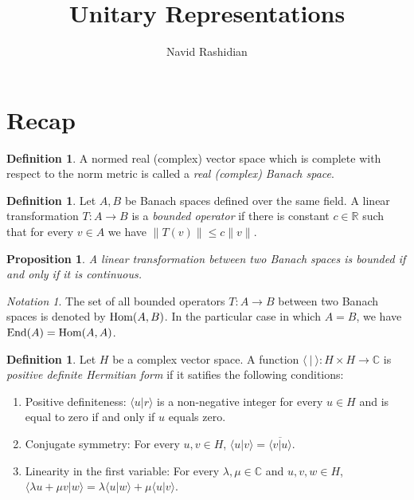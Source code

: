\documentclass[12pt]{article}
\title{Unitary Representations}
\author{Navid Rashidian}
\date{}
\newtheorem{prop}[thm]{Proposition}
\theoremstyle{definition}
\newtheorem{dfn}[thm]{Definition}
\theoremstyle{remark}
\newtheorem{notation}[thm]{Notation}
\newcommand{\Comp}{\mathbb{C}}
\newcommand{\Real}{\mathbb{R}}
\newcommand{\Hom}[2]{\textup{Hom}(#1,#2)}
\newcommand{\End}[1]{\textup{End}(#1)}
\begin{document}
    \maketitle

    \section{Recap}

    \begin{dfn}
        A normed real (complex) vector space which is complete with respect to the norm metric is called a \emph{real (complex) Banach space}.
    \end{dfn}

    \begin{dfn}
        Let $A,B$ be Banach spaces defined over the same field. A linear transformation $T\colon A\to B$ is a \emph{bounded operator} if there is constant $c\in\Real$ such that for every $v\in A$ we have $\|T(v)\|\leq c\|v\|$.
    \end{dfn}

    \begin{prop}
        A linear transformation between two Banach spaces is bounded if and only if it is continuous.
    \end{prop}

    \begin{notation}
        The set of all bounded operators $T\colon A\to B$ between two Banach spaces is denoted by $\Hom{A}{B}$. In the particular case in which $A=B$, we have $\End{A}=\Hom{A}{A}$.
    \end{notation}

    \begin{dfn}
        Let $H$ be a complex vector space. A function $\langle\ |\ \rangle\colon H\times H\to\Comp$ is \emph{positive definite Hermitian form} if it satifies the following conditions:
        \begin{enumerate}
            \item Positive definiteness: $\langle u|r\rangle$ is a non-negative integer for every $u\in H$ and is equal to zero if and only if $u$ equals zero.
            \item Conjugate symmetry: For every $u,v\in H$, $\langle u|v\rangle = \overline{\langle v|u \rangle}$.
            \item Linearity in the first variable: For every $\lambda,\mu\in\Comp$ and $u,v,w\in H$, $\langle\lambda u+\mu v|w\rangle=\lambda\langle u|w\rangle+\mu\langle u|v\rangle$.
        \end{enumerate}
    \end{dfn}
    
\end{document}
